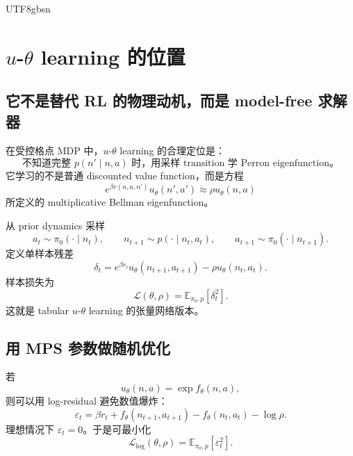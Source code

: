 \documentclass[11pt]{article}
\begin{document}
\begin{CJK*}{UTF8}{gbsn}
\section{\texorpdfstring{\(u\)-\(\theta\)}{u-theta} learning 的位置}

\subsection{它不是替代 RL 的物理动机，而是 model-free 求解器}

在受控格点 MDP 中，\(u\)-\(\theta\) learning 的合理定位是：
\begin{equation}
    \text{不知道完整 }p(n'\mid n,a)\text{ 时，用采样 transition 学 Perron eigenfunction。}
\end{equation}
它学习的不是普通 discounted value function，而是方程
\begin{equation}
    e^{\beta r(n,a,n')}
    u_\theta(n',a')
    \approx
    \rho u_\theta(n,a)
\end{equation}
所定义的 multiplicative Bellman eigenfunction。

从 prior dynamics 采样
\begin{equation}
    a_t\sim\pi_0(\cdot\mid n_t),
    \qquad
    n_{t+1}\sim p(\cdot\mid n_t,a_t),
    \qquad
    a_{t+1}\sim\pi_0(\cdot\mid n_{t+1}).
\end{equation}
定义单样本残差
\begin{equation}
    \delta_t
    =
    e^{\beta r_t}u_\theta(n_{t+1},a_{t+1})
    -
    \rho u_\theta(n_t,a_t).
    \label{eq:td-residual-u}
\end{equation}
样本损失为
\begin{equation}
    \mathcal L(\theta,\rho)
    =
    \mathbb E_{\pi_0,p}
    \left[
        \delta_t^2
    \right].
    \label{eq:u-theta-loss}
\end{equation}
这就是 tabular \(u\)-\(\theta\) learning 的张量网络版本。

\subsection{用 MPS 参数做随机优化}

若
\begin{equation}
    u_\theta(n,a)=\exp f_\theta(n,a),
\end{equation}
则可以用 log-residual 避免数值爆炸：
\begin{equation}
    \varepsilon_t
    =
    \beta r_t
    +
    f_\theta(n_{t+1},a_{t+1})
    -
    f_\theta(n_t,a_t)
    -
    \log\rho.
    \label{eq:log-residual}
\end{equation}
理想情况下 \(\varepsilon_t=0\)。于是可最小化
\begin{equation}
    \mathcal L_{\log}(\theta,\rho)
    =
    \mathbb E_{\pi_0,p}
    \left[
        \varepsilon_t^2
    \right].
    \label{eq:log-loss}
\end{equation}


\end{CJK*}
\end{document}
